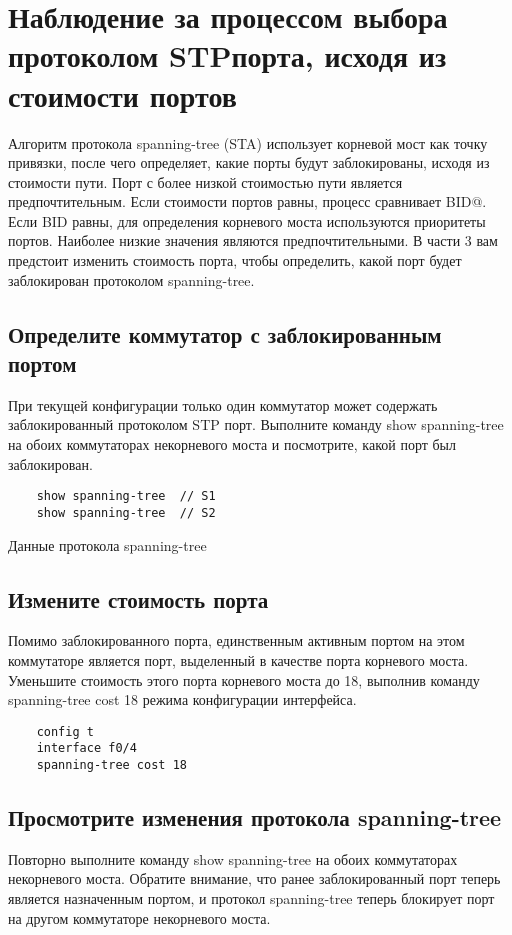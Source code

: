 \section{Наблюдение за процессом выбора протоколом STPпорта,
	исходя из стоимости портов}
Алгоритм протокола spanning-tree (STA) использует корневой мост
как точку привязки, после чего определяет, какие порты будут заблокированы,
исходя из стоимости пути.
Порт с более низкой стоимостью пути является предпочтительным.
Если стоимости портов равны, процесс сравнивает BID@.
Если BID равны, для определения корневого моста используются приоритеты портов.
Наиболее низкие значения являются предпочтительными.
В части 3 вам предстоит изменить стоимость порта, чтобы определить, какой порт будет заблокирован протоколом
spanning-tree.

\subsection{Определите коммутатор с заблокированным портом}
При текущей конфигурации только один коммутатор может содержать
заблокированный протоколом STP порт.
Выполните команду show spanning-tree на обоих коммутаторах некорневого моста
и посмотрите, какой порт был заблокирован.

\begin{verbatim}
    show spanning-tree  // S1
    show spanning-tree  // S2
\end{verbatim}

\begin{image}
	\caption{Данные протокола spanning-tree}
	\label{fig:2:spanning_tree}
\end{image}


\subsection{Измените стоимость порта}
Помимо заблокированного порта, единственным активным портом на этом коммутаторе является порт,
выделенный в качестве порта корневого моста.
Уменьшите стоимость этого порта корневого моста до 18, выполнив команду spanning-tree cost 18 режима конфигурации
интерфейса.


\begin{verbatim}
	config t
	interface f0/4
	spanning-tree cost 18
\end{verbatim}

\subsection{Просмотрите изменения протокола spanning-tree}
Повторно выполните команду show spanning-tree
на обоих коммутаторах некорневого моста. Обратите внимание,
что ранее заблокированный порт теперь является назначенным портом,
и протокол spanning-tree теперь блокирует порт
на другом коммутаторе некорневого моста.

